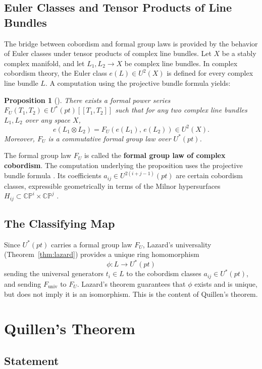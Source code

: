 \documentclass[12pt]{article}
\newtheorem{proposition}[theorem]{Proposition}
\theoremstyle{definition}
\theoremstyle{remark}
\newcommand{\CP}{\mathbb{CP}}
\newcommand{\Ustar}{U^*(pt)}
\begin{document}
\subsection{Euler Classes and Tensor Products of Line Bundles}

The bridge between cobordism and formal group laws is provided by the behavior of Euler classes under tensor products of complex line bundles. Let $X$ be a stably complex manifold, and let $L_1, L_2 \to X$ be complex line bundles. In complex cobordism theory, the Euler class $e(L) \in U^2(X)$ is defined for every complex line bundle $L$. A computation using the projective bundle formula yields:

\begin{proposition}[{\cite{FGL12, Qui69}}]
There exists a formal power series $F_U(T_1, T_2) \in \Ustar[[T_1, T_2]]$ such that for any two complex line bundles $L_1, L_2$ over any space $X$,
\[
  e(L_1 \otimes L_2) = F_U\!\left(e(L_1),\, e(L_2)\right) \in U^2(X).
\]
Moreover, $F_U$ is a commutative formal group law over $\Ustar$.
\end{proposition}

The formal group law $F_U$ is called the \textbf{formal group law of complex cobordism}. The computation underlying the proposition uses the projective bundle formula \cite{Switzer75}. Its coefficients $a_{ij} \in U^{2(i+j-1)}(pt)$ are certain cobordism classes, expressible geometrically in terms of the Milnor hypersurfaces $H_{ij} \subset \CP^i \times \CP^j$ \cite{Milnor55, Rav13, Pan11}.

\subsection{The Classifying Map}

Since $\Ustar$ carries a formal group law $F_U$, Lazard's universality (Theorem~\ref{thm:lazard}) provides a unique ring homomorphism
\[
  \phi : L \longrightarrow \Ustar
\]
sending the universal generators $t_i \in L$ to the cobordism classes $a_{ij} \in \Ustar$, and sending $F_{\mathrm{univ}}$ to $F_U$. Lazard's theorem guarantees that $\phi$ exists and is unique, but does not imply it is an isomorphism. This is the content of Quillen's theorem.

\section{Quillen's Theorem}\label{sec:quillen}

\subsection{Statement}
\end{document}

